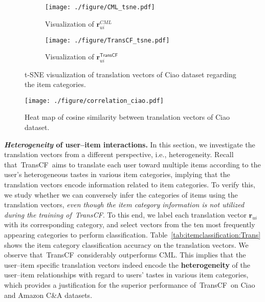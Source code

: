 \documentclass[conference]{IEEEtran}
\newcommand{\propose}{\textsf{{TransCF}}}
\begin{document}
\begin{figure*}[t]
	\centering
	\begin{minipage}{0.6\textwidth}
\centering\captionsetup{width=0.95\linewidth}
		\begin{subfigure}{0.495\textwidth}
			\centering
			\texttt{[image: ./figure/CML\_tsne.pdf]}
			\caption{Visualization of $\bm{r}^{CML}_{ui}$}
		\end{subfigure}
		\begin{subfigure}{0.495\textwidth}
			\centering
			\texttt{[image: ./figure/TransCF\_tsne.pdf]}
			\caption{Visualization of $\bm{r}^{\propose}_{ui}$}
		\end{subfigure}
\caption{t-SNE visualization of translation vectors of Ciao dataset regarding the item categories.}
		\label{fig:tsne}
	\end{minipage}\hfill
	\begin{minipage}{0.4\textwidth}
		\centering
\vspace{-7pt}
		\texttt{[image: ./figure/correlation\_ciao.pdf]}
\caption{Heat map of cosine similarity between translation vectors of Ciao dataset. }
		\label{fig:cosine}
	\end{minipage}
	\vspace{-2ex}
\end{figure*}

\smallskip
\noindent\textbf{\textit{Heterogeneity} of user--item interactions. }
In this section, we investigate the translation vectors from a different perspective, i.e., heterogeneity. 
Recall that~\propose~aims to translate each user toward multiple items according to the user's heterogeneous tastes in various item categories, implying that
the translation vectors encode information related to item categories.
To verify this, we study whether we can conversely infer the categories of items using the translation vectors, \textit{even though the item category information is not utilized during the training of~\propose}. 
To this end, we label each translation vector $\bm{r}_{ui} $ with its corresponding category, and select vectors from the ten most frequently appearing categories
to perform classification.
Table~\ref{tab:itemclassification:Trans} shows the item category classification accuracy on the translation vectors. We observe that~\propose~considerably outperforms CML. This implies that the user--item specific translation vectors indeed encode the \textbf{heterogeneity} of the user--item relationships with regard to users' tastes in various item categories,
which provides a justification for the superior performance of~\propose~on Ciao and Amazon C\&A datasets.
\end{document}
